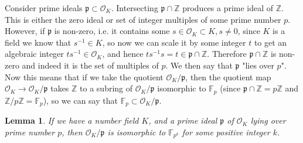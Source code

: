 \documentclass{article}
\newtheorem{lemma}[theorem]{Lemma}
\theoremstyle{definition}
\theoremstyle{definition}
\theoremstyle{definition}
\begin{document}
Consider prime ideals $\mathfrak{p}\subset\mathcal{O}_K$. Intersecting $\mathfrak p\cap\mathbb Z$ produces a prime ideal of $\mathbb Z$. This is either the zero ideal or set of integer multiples of some prime number $p$. However, if $\mathfrak p$ is non-zero, i.e. it contains some $s\in\mathcal O_K\subset K,s\neq0$, since $K$ is a field we know that $s^{-1}\in K$, so now we can scale it by some integer $t$ to get an algebraic integer $ts^{-1}\in\mathcal O_K$, and hence $ts^{-1}s=t\in\mathfrak p\cap\mathbb Z$. Therefore $\mathfrak p\cap\mathbb Z$ is non-zero and indeed it is the set of multiples of $p$. We then say that $\mathfrak p$ "lies over $p$".
\newline\newline
Now this means that if we take the quotient $\mathcal O_K/\mathfrak p$, then the quotient map $\mathcal O_K\rightarrow\mathcal O_K/\mathfrak p$ takes $\mathbb Z$ to a subring of $\mathcal O_K/\mathfrak p$ isomorphic to $\mathbb F_p$ (since $\mathfrak p\cap\mathbb Z=p\mathbb Z$ and $\mathbb Z/p\mathbb Z=\mathbb F_p$), so we can say that $\mathbb F_p\subset\mathcal O_K/\mathfrak p$.

\begin{lemma}\label{Opfield}
    If we have a number field $K$, and a prime ideal $\mathfrak p$ of $\mathcal O_K$ lying over prime number $p$, then $\mathcal O_K/\mathfrak p$ is isomorphic to $\mathbb F_{p^k}$ for some positive integer $k$.
\end{lemma}
\end{document}
